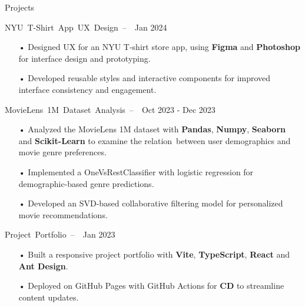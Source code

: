\documentclass[]{mcdowellcv}
\begin{document}
	\vspace{-0.25cm}
	
	\begin{cvsection}{Projects}
			\begin{cvsubsection}{\mbox{NYU T-Shirt App UX Design --
							 \hspace{-0.2cm}
					 		 \mdseries\itshape{}
					 		 }}{}{Jan 2024}
			\begin{itemize}
				\item[•] Designed UX for an NYU T-shirt store app, using \textbf{Figma} and \textbf{Photoshop} for interface design and prototyping.
				\item[•] Developed reusable styles and interactive components for improved interface consistency and engagement.
				\end{itemize}
				\end{cvsubsection}
				\vspace{-0.2cm}
			\begin{cvsubsection}{\mbox{MovieLens 1M Dataset Analysis -- 							 \hspace{-0.2cm}
					 		 \mdseries\itshape{}
					 		 }}{}{Oct 2023 - Dec 2023}
			\begin{itemize}
				\item[•] Analyzed the MovieLens 1M dataset with \textbf{Pandas}, \textbf{Numpy}, \textbf{Seaborn} and \textbf{Scikit-Learn} to examine the relation between user demographics and movie genre preferences.
				\item[•] Implemented a OneVsRestClassifier with logistic regression for demographic-based genre predictions.
				\item[•] Developed an SVD-based collaborative filtering model for personalized movie recommendations.
			\end{itemize}
			\end{cvsubsection}
			\vspace{-0.2cm}
		\begin{cvsubsection}{\mbox{Project Portfolio -- 										 \hspace{-0.2cm}
					 		 \mdseries\itshape{}
					 		 }}{}{Jan 2023}
			\begin{itemize}
	\item[•]Built a responsive project portfolio with \textbf{Vite}, \textbf{TypeScript}, \textbf{React} and \textbf{Ant Design}.
	\item[•]Deployed on GitHub Pages with GitHub Actions for \textbf{CD} to streamline content updates.

\end{itemize}
\end{cvsubsection}
\end{cvsection}
\end{document}
